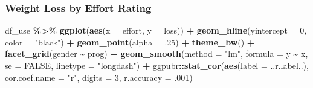 \documentclass[
]{article}
\newenvironment{Shaded}{\begin{snugshade}}{\end{snugshade}}
\newcommand{\AttributeTok}[1]{\textcolor[rgb]{0.13,0.29,0.53}{#1}}
\newcommand{\ConstantTok}[1]{\textcolor[rgb]{0.56,0.35,0.01}{#1}}
\newcommand{\DecValTok}[1]{\textcolor[rgb]{0.00,0.00,0.81}{#1}}
\newcommand{\FunctionTok}[1]{\textcolor[rgb]{0.13,0.29,0.53}{\textbf{#1}}}
\newcommand{\NormalTok}[1]{#1}
\newcommand{\SpecialCharTok}[1]{\textcolor[rgb]{0.81,0.36,0.00}{\textbf{#1}}}
\newcommand{\StringTok}[1]{\textcolor[rgb]{0.31,0.60,0.02}{#1}}
\begin{document}
\clearpage

\hypertarget{weight-loss-by-effort-rating}{%
\subsubsection{Weight Loss by Effort
Rating}\label{weight-loss-by-effort-rating}}

\begin{Shaded}
\begin{Highlighting}[]
\NormalTok{df\_use }\SpecialCharTok{\%\textgreater{}\%} 
  \FunctionTok{ggplot}\NormalTok{(}\FunctionTok{aes}\NormalTok{(}\AttributeTok{x =}\NormalTok{ effort,}
             \AttributeTok{y =}\NormalTok{ loss)) }\SpecialCharTok{+}
  \FunctionTok{geom\_hline}\NormalTok{(}\AttributeTok{yintercept =} \DecValTok{0}\NormalTok{, }\AttributeTok{color =} \StringTok{"black"}\NormalTok{) }\SpecialCharTok{+}
  \FunctionTok{geom\_point}\NormalTok{(}\AttributeTok{alpha =}\NormalTok{ .}\DecValTok{25}\NormalTok{) }\SpecialCharTok{+}
  \FunctionTok{theme\_bw}\NormalTok{() }\SpecialCharTok{+}
  \FunctionTok{facet\_grid}\NormalTok{(gender }\SpecialCharTok{\textasciitilde{}}\NormalTok{ prog) }\SpecialCharTok{+}
  \FunctionTok{geom\_smooth}\NormalTok{(}\AttributeTok{method =} \StringTok{"lm"}\NormalTok{,}
              \AttributeTok{formula =}\NormalTok{ y }\SpecialCharTok{\textasciitilde{}}\NormalTok{ x,}
              \AttributeTok{se =} \ConstantTok{FALSE}\NormalTok{,}
              \AttributeTok{linetype =} \StringTok{"longdash"}\NormalTok{) }\SpecialCharTok{+}
\NormalTok{  ggpubr}\SpecialCharTok{::}\FunctionTok{stat\_cor}\NormalTok{(}\FunctionTok{aes}\NormalTok{(}\AttributeTok{label =}\NormalTok{ ..r.label..),}
                   \AttributeTok{cor.coef.name =} \StringTok{"r"}\NormalTok{,}
                   \AttributeTok{digits =} \DecValTok{3}\NormalTok{,}
                   \AttributeTok{r.accuracy =}\NormalTok{ .}\DecValTok{001}\NormalTok{)}
\end{Highlighting}
\end{Shaded}
\end{document}

